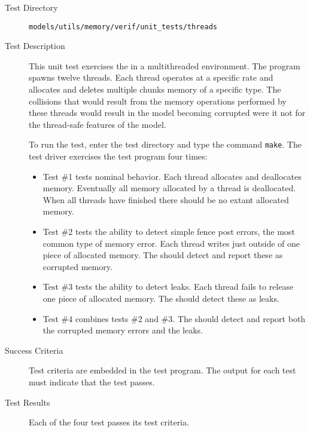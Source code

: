 \label{test:threads}
\begin{description}
\item[Test Directory]
{\tt models/utils/memory/verif/unit\_tests/threads}

\item[Test Description] This unit test exercises the
\ModelDesc in a multithreaded environment. The program spawns twelve threads.
Each thread operates at a specific rate and
allocates and deletes multiple chunks memory of a specific type.
The collisions that would result from the memory operations performed by
these threads would result in the model becoming corrupted were it not
for the thread-safe features of the model.

To run the test, enter the test directory and type the command {\tt make}.
The test driver exercises the test program four times:
\begin{itemize}
\item Test \#1 tests nominal behavior. Each thread allocates and deallocates
memory. Eventually all memory allocated by a thread is deallocated. When all
threads have finished there should be no extant allocated memory.

\item Test \#2 tests the ability to detect simple fence post errors, the
most common type of memory error. Each thread writes just outside of one
piece of allocated memory. The \ModelDesc should detect and report these
as corrupted memory.

\item Test \#3 tests the ability to detect leaks. Each thread fails to release
one piece of allocated memory. The \ModelDesc should detect these as leaks.

\item Test \#4 combines tests \#2 and \#3. The \ModelDesc should detect and
report both the corrupted memory errors and the leaks.
\end{itemize}

\item[Success Criteria]
Test criteria are embedded in the test program. The output for each test
must indicate that the test passes.

\item[Test Results] Each of the four test passes its test criteria.


\end{description}
